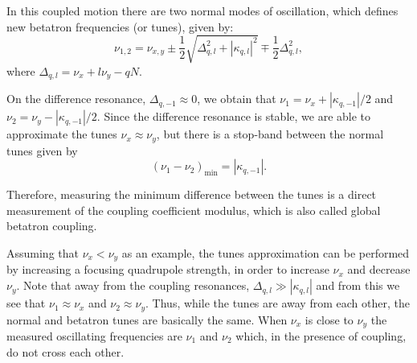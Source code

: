 In this coupled motion there are two normal modes of oscillation, which defines new betatron frequencies (or tunes), given by:
\begin{equation}
    \nu_{1, 2} = \nu_{x, y} \pm \dfrac{1}{2}\sqrt{\Delta_{q, l}^2 + |\kappa_{q, l}|^2} \mp \dfrac{1}{2}\Delta_{q, l}^2,
    \label{eq:eigentunes}
\end{equation}
where $\Delta_{q, l} = \nu_x + l\nu_y - q N$. 

On the difference resonance, $\Delta_{q, -1} \approx 0$, we obtain that $\nu_1 = \nu_x + |\kappa_{q, -1}|/2$ and $\nu_2 = \nu_y - |\kappa_{q, -1}|/2$. Since the difference resonance is stable, we are able to approximate the tunes $\nu_x \approx \nu_y$, but there is a stop-band between the normal tunes given by
\begin{equation}
\left(\nu_1 - \nu_2\right)_{\mathrm{min}} = |\kappa_{q, -1}|.
\end{equation}

Therefore, measuring the minimum difference between the tunes is a direct measurement of the coupling coefficient modulus, which is also called global betatron coupling. 

Assuming that $\nu_x < \nu_y$ as an example, the tunes approximation can be performed by increasing a focusing quadrupole strength, in order to increase $\nu_x$ and decrease $\nu_y$. Note that away from the coupling resonances, $\Delta_{q, l} \gg |\kappa_{q, l}|$ and from this we see that $\nu_1 \approx \nu_x$ and $\nu_2 \approx \nu_y$. Thus, while the tunes are away from each other, the normal and betatron tunes are basically the same. When $\nu_x$ is close to $\nu_y$ the measured oscillating frequencies are $\nu_1$ and $\nu_2$ which, in the presence of coupling, do not cross each other.








